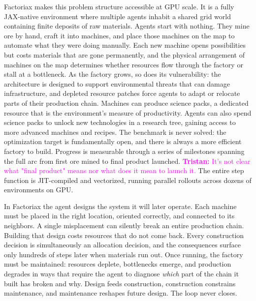 \documentclass{article}
\newcommand{\tristan}[1]{\textcolor{magenta}{\textbf{Tristan:} #1}}
\begin{document}
Factoriax makes this problem structure accessible at GPU scale.
It is a fully JAX-native environment where multiple agents inhabit a shared grid world containing finite deposits of raw materials.
Agents start with nothing. They mine ore by hand, craft it into machines, and place those machines on the map to automate what they were doing manually.
Each new machine opens possibilities but costs materials that are gone permanently, and the physical arrangement of machines on the map determines whether resources flow through the factory or stall at a bottleneck.
As the factory grows, so does its vulnerability: the architecture is designed to support environmental threats that can damage infrastructure, and depleted resource patches force agents to adapt or relocate parts of their production chain.
Machines can produce science packs, a dedicated resource that is the environment's measure of productivity.
Agents can also spend science packs to unlock new technologies in a research tree, gaining access to more advanced machines and recipes.
The benchmark is never solved: the optimization target is fundamentally open, and there is always a more efficient factory to build.
Progress is measurable through a series of milestones spanning the full arc from first ore mined to final product launched. \tristan{It's not clear what "final product" means nor what does it mean to launch it.}
The entire step function is JIT-compiled and vectorized, running parallel rollouts across dozens of environments on GPU.


In Factoriax the agent designs the system it will later operate.
Each machine must be placed in the right location, oriented correctly, and connected to its neighbors.
A single misplacement can silently break an entire production chain.
Building that design costs resources that do not come back.
Every construction decision is simultaneously an allocation decision, and the consequences surface only hundreds of steps later when materials run out.
Once running, the factory must be maintained: resources deplete, bottlenecks emerge, and production degrades in ways that require the agent to diagnose \emph{which} part of the chain it built has broken and why.
Design feeds construction, construction constrains maintenance, and maintenance reshapes future design. The loop never closes.
\end{document}
